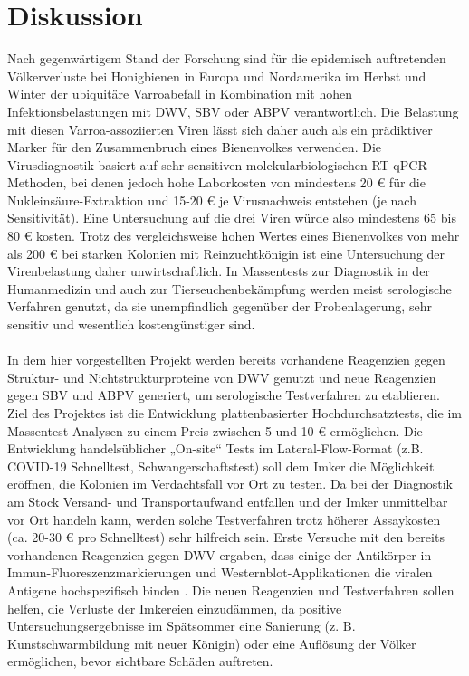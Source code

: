 \section{Diskussion}

Nach gegenwärtigem Stand der Forschung sind für die epidemisch auftretenden Völkerverluste bei Honigbienen in Europa und Nordamerika im Herbst und Winter der ubiquitäre Varroabefall in Kombination mit hohen Infektionsbelastungen mit DWV, SBV oder ABPV verantwortlich. Die Belastung mit diesen Varroa-assoziierten Viren lässt sich daher auch als ein prädiktiver Marker für den Zusammenbruch eines Bienenvolkes verwenden. Die Virusdiagnostik basiert auf sehr sensitiven molekularbiologischen RT-qPCR Methoden, bei denen jedoch hohe Laborkosten von mindestens 20 € für die Nukleinsäure-Extraktion und 15-20 € je Virusnachweis entstehen (je nach Sensitivität). Eine Untersuchung auf die drei Viren würde also mindestens 65 bis 80 € kosten. Trotz des vergleichsweise hohen Wertes eines Bienenvolkes von mehr als 200 € bei starken Kolonien mit Reinzuchtkönigin ist eine Untersuchung der Virenbelastung daher unwirtschaftlich. In Massentests zur Diagnostik in der Humanmedizin und auch zur Tierseuchenbekämpfung werden meist serologische Verfahren genutzt, da sie unempfindlich gegenüber der Probenlagerung, sehr sensitiv und wesentlich kostengünstiger sind. 
\\
\\
In dem hier vorgestellten Projekt werden bereits vorhandene Reagenzien gegen Struktur- und Nichtstrukturproteine von DWV genutzt und neue Reagenzien gegen SBV und ABPV generiert, um serologische Testverfahren zu etablieren. Ziel des Projektes ist die Entwicklung plattenbasierter Hochdurchsatztests, die im Massentest Analysen zu einem Preis zwischen 5 und 10 € ermöglichen. Die Entwicklung handelsüblicher „On-site“ Tests im Lateral-Flow-Format (z.B. COVID-19 Schnelltest, Schwangerschaftstest) soll dem Imker die Möglichkeit eröffnen, die Kolonien im Verdachtsfall vor Ort zu testen. Da bei der Diagnostik am Stock Versand- und Transportaufwand entfallen und der Imker unmittelbar vor Ort handeln kann, werden solche Testverfahren trotz höherer Assaykosten (ca. 20-30 € pro Schnelltest) sehr hilfreich sein. Erste Versuche mit den bereits vorhandenen Reagenzien gegen DWV ergaben, dass einige der Antikörper in Immun-Fluoreszenzmarkierungen und Westernblot-Applikationen die viralen Antigene hochspezifisch binden \citep{Lamp2016}. Die neuen Reagenzien und Testverfahren sollen helfen, die Verluste der Imkereien einzudämmen, da positive Untersuchungsergebnisse im Spätsommer eine Sanierung (z. B. Kunstschwarmbildung mit neuer Königin) oder eine Auflösung der Völker ermöglichen, bevor sichtbare Schäden auftreten.
